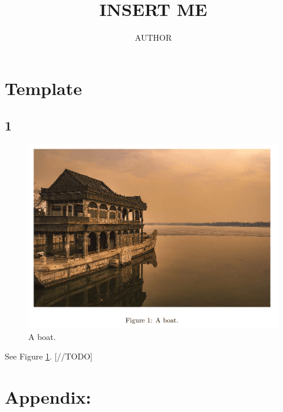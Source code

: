 \documentclass{article}
\title{INSERT ME}
\author{AUTHOR}
\date{}
\begin{document}
\maketitle

\tableofcontents

\clearpage %
\section{Template}
\subsection{1}
\begin{figure}[h]
  \includegraphics[width=\linewidth]{boat.png}
  \caption{A boat.}
  \label{fig:boat}
\end{figure}
See Figure \ref{fig:boat}.
[//TODO]


\cleardoublepage
\section{Appendix:}
\end{document}
